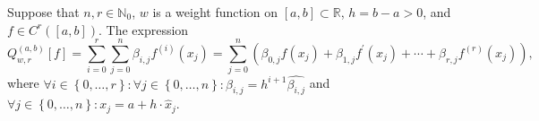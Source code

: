 \begin{frame}
    \begin{definition}
        Suppose that $n,r\in\mathbb{N}_{0}$,
        $w$ is a weight function on
        \begin{math}
            \left[a,b\right]\subset
            \mathbb{R}
        \end{math},
        $h=b-a>0$, and
        \begin{math}
            f\in
            C^{r}\left(
            \left[a,b\right]
            \right)
        \end{math}.
        The expression
        \begin{equation*}
            Q^{\left(a,b\right)}_{w,r}
            \left[f\right]=
            \sum_{i=0}^{r}
            \sum_{j=0}^{n}
            \beta_{i,j}
            f^{\left(i\right)}
            \left(x_{j}\right)=
            \sum_{j=0}^{n}
            \left(
            \beta_{0,j}
            f\left(x_{j}\right)+
            \beta_{1,j}
            f^{\prime}
            \left(x_{j}\right)+
            \cdots+
            \beta_{r,j}
            f^{\left(r\right)}
            \left(x_{j}\right)
            \right),
        \end{equation*}
        where
        \begin{math}
            \forall i\in
            \left\{0,\dotsc,r\right\}:
            \forall j\in
            \left\{0,\dotsc,n\right\}:
            \beta_{i,j}=
            h^{i+1}
            \widehat{\beta_{i,j}}
        \end{math}
        and
        \begin{math}
            \forall j\in
            \left\{0,\dotsc,n\right\}:
            x_{j}=
            a+
            h\cdot
            \widehat{x}_{j}
        \end{math}.
    \end{definition}
\end{frame}

